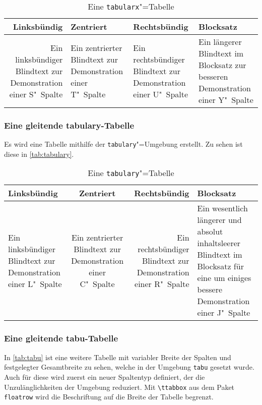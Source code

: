 \documentclass[english,ngerman]{tudscrreprt}
\begin{document}
\begin{table}
\begin{tabularx}{\textwidth}{@{}DEFY@{}}
\toprule
\textbf{Linksbündig} & \textbf{Zentriert} &
\textbf{Rechtsbündig} & \textbf{Blocksatz} \tabularnewline
\midrule
Ein linksbündiger Blindtext zur Demonstration einer S"~Spalte &
Ein zentrierter Blindtext zur Demonstration einer T"~Spalte &
Ein rechtsbündiger Blindtext zur Demonstration einer U"~Spalte &
Ein längerer Blindtext im Blocksatz zur besseren Demonstration
einer Y"~Spalte\tabularnewline
\bottomrule
\end{tabularx}
\caption{Eine \texttt{tabularx}"=Tabelle}\label{tab:tabularx}
\end{table}

\subsubsection{Eine gleitende tabulary-Tabelle}
Es wird eine Tabelle mithilfe der \texttt{tabulary}"=Umgebung erstellt.
Zu sehen ist diese in \autoref{tab:tabulary}.

\begin{table}
\begin{tabulary}{\textwidth}{@{}LCRJ@{}}
\toprule
\textbf{Linksbündig} & \textbf{Zentriert} &
\textbf{Rechtsbündig} & \textbf{Blocksatz} \tabularnewline\midrule
Ein linksbündiger Blindtext zur Demonstration einer L"~Spalte &
Ein zentrierter Blindtext zur Demonstration einer C"~Spalte &
Ein rechtsbündiger Blindtext zur Demonstration einer R"~Spalte &
Ein wesentlich längerer und absolut inhaltsleerer Blindtext im
Blocksatz für eine um einiges bessere Demonstration einer J"~Spalte
\tabularnewline\bottomrule
\end{tabulary}
\caption{Eine \texttt{tabulary}"=Tabelle}\label{tab:tabulary}
\end{table}

\subsubsection{Eine gleitende tabu-Tabelle}
In \autoref{tab:tabu} ist eine weitere Tabelle mit variabler Breite der
Spalten und festgelegter Gesamtbreite zu sehen, welche in der Umgebung
\texttt{tabu} gesetzt wurde. Auch für diese wird zuerst ein neuer
Spaltentyp definiert, der die Unzulänglichkeiten der Umgebung reduziert.
Mit \texttt{\textbackslash ttabbox} aus dem Paket \texttt{floatrow} wird
die Beschriftung auf die Breite der Tabelle begrenzt.

\makeatletter
\newcolumntype{Z}{}
\renewcommand*{\NC@rewrite@Z}[1][]{%
  \NC@find>{\hspace{0pt}}X[#1]<{\@finalstrut\@arstrutbox}%
}
\makeatother
\end{document}
